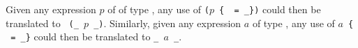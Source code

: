 \progb{
\update\_\id\ :: \Person\ $\rightarrow$ \Int\ $\rightarrow$ \Person\\
\instance\ \update\_\id\ (\Person\ \id\ \name) \new\_\id\ = \Person\ \new\_\id\ \name\\ \\

\update\_\id\ :: \Address\ $\rightarrow$ \Int\ $\rightarrow$ \Address\\
\instance\ \update\_\id\ (\Address\ \id\ \address) \new\_\id\ = \Address\ \new\_\id\ \address
}

Given any expression $p$ of of type \Person, any use of {\tt ($p$ \{
  \id\ = \new\_\id \})} could then be translated to {\tt
  (\update\_\id\ $p$ \new\_\id)}. Similarly, given any expression $a$
of type \Address, any use of {\tt $a$ \{ \id\ = \new\_\id \}} could
then be translated to {\tt \update\_\id\ $a$ \new\_\id}.

